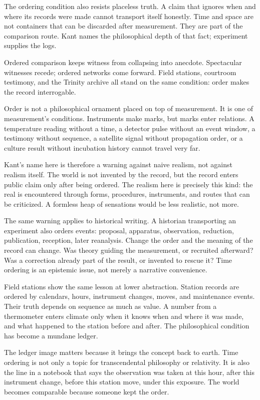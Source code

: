 The ordering condition also resists placeless truth. A claim that ignores
when and where its records were made cannot transport itself honestly.
Time and space are not containers that can be discarded after measurement.
They are part of the comparison route. Kant names the philosophical depth
of that fact; experiment supplies the logs.

Ordered comparison keeps witness from collapsing into anecdote.
Spectacular witnesses recede; ordered networks come forward. Field
stations, courtroom testimony, and the Trinity archive all stand on the
same condition: order makes the record interrogable.

Order is not a philosophical ornament placed on top of measurement. It is
one of measurement's conditions. Instruments make marks, but marks enter
relations. A temperature reading without a time, a detector pulse without
an event window, a testimony without sequence, a satellite signal without
propagation order, or a culture result without incubation history cannot
travel very far.

Kant's name here is therefore a warning against naive realism, not against
realism itself. The world is not invented by the record, but the record
enters public claim only after being ordered. The realism here is
precisely this kind: the real is encountered through forms, procedures,
instruments, and routes that can be criticized. A formless heap of
sensations would be less realistic, not more.

The same warning applies to historical writing. A historian transporting
an experiment also orders events: proposal, apparatus, observation,
reduction, publication, reception, later reanalysis. Change the order and
the meaning of the record can change. Was theory guiding the measurement,
or recruited afterward? Was a correction already part of the result, or
invented to rescue it? Time ordering is an epistemic issue, not merely a
narrative convenience.

Field stations show the same lesson at lower abstraction. Station records
are ordered by calendars, hours, instrument changes, moves, and
maintenance events. Their truth depends on sequence as much as value. A
number from a thermometer enters climate only when it knows when and where
it was made, and what happened to the station before and after. The
philosophical condition has become a mundane ledger.

The ledger image matters because it brings the concept back to earth.
Time ordering is not only a topic for transcendental philosophy or
relativity. It is also the line in a notebook that says the observation
was taken at this hour, after this instrument change, before this station
move, under this exposure. The world becomes comparable because someone
kept the order.

